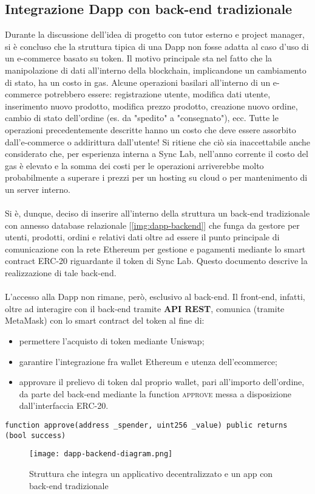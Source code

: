     \subsection{Integrazione Dapp con back-end tradizionale}
    \label{context:structure:dapp-backend}
    Durante la discussione dell'idea di progetto con tutor esterno e project manager, si è concluso che la struttura tipica di una Dapp non fosse adatta al caso d'uso di un e-commerce basato su token. Il motivo principale sta nel fatto che la manipolazione di dati all'interno della blockchain, implicandone un cambiamento di stato, ha un costo in gas. Alcune operazioni basilari all'interno di un e-commerce potrebbero essere: registrazione utente, modifica dati utente, inserimento nuovo prodotto, modifica prezzo prodotto, creazione nuovo ordine, cambio di stato dell'ordine (es. da "spedito" a "consegnato"), ecc. Tutte le operazioni precedentemente descritte hanno un costo che deve essere assorbito dall'e-commerce o addirittura dall'utente! Si ritiene che ciò sia inaccettabile anche considerato che, per esperienza interna a Sync Lab, nell'anno corrente il costo del gas è elevato e la somma dei costi per le operazioni arriverebbe molto probabilmente a superare i prezzi per un hosting su cloud o per mantenimento di un server interno.
    \\\\
    Si è, dunque, deciso di inserire all'interno della struttura un back-end tradizionale con annesso database relazionale [\autoref{img:dapp-backend}] che funga da gestore per utenti, prodotti, ordini e relativi dati oltre ad essere il punto principale di comunicazione con la rete Ethereum per gestione e pagamenti mediante lo smart contract ERC-20 riguardante il token di Sync Lab. Questo documento descrive la realizzazione di tale back-end.
    \\\\
    L'accesso alla Dapp non rimane, però, esclusivo al back-end. Il front-end, infatti, oltre ad interagire con il back-end tramite \textbf{API REST}, comunica (tramite MetaMask) con lo smart contract del token al fine di:
    \begin{itemize}
        \item permettere l'acquisto di token mediante Uniswap;
        \item garantire l'integrazione fra wallet Ethereum e utenza dell'ecommerce;
        \item approvare il prelievo di token dal proprio wallet, pari all'importo dell'ordine,  da parte del back-end mediante la function \textsc{approve} messa a disposizione dall'interfaccia ERC-20.
    \end{itemize}
    \begin{lstlisting}[language=Solidity]
function approve(address _spender, uint256 _value) public returns (bool success)
    \end{lstlisting}

    \begin{figure}[p]
        \centering
        \hspace*{-2cm}
        \texttt{[image: dapp-backend-diagram.png]}
        \caption{Struttura che integra un applicativo decentralizzato e un app con back-end tradizionale}
        \label{img:dapp-backend}
    \end{figure}